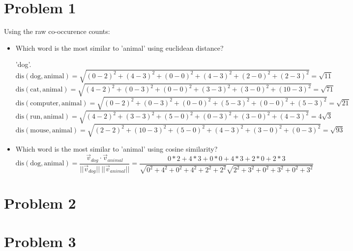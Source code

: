 \documentclass[twoside,11pt]{homework}
\date{\today} %
\begin{document}
\maketitle

\section*{Problem 1}

Using the raw co-occurence counts:
\begin{itemize}
\item Which word is the most similar to 'animal' using euclidean distance?

  'dog'.
  \[
    \text{dis}(\text{dog}, \text{animal})
    = \sqrt{(0-2)^2+(4-3)^2+(0-0)^2+(4-3)^2+(2-0)^2+(2-3)^2}
    = \sqrt{11}
  \]
  \[
    \text{dis}(\text{cat}, \text{animal})
    = \sqrt{(4-2)^2+(0-3)^2+(0-0)^2+(3-3)^2+(3-0)^2+(10-3)^2}
    = \sqrt{71}
  \]
  \[
    \text{dis}(\text{computer}, \text{animal})
    = \sqrt{(0-2)^2+(0-3)^2+(0-0)^2+(5-3)^2+(0-0)^2+(5-3)^2}
    = \sqrt{21}
  \]
  \[
    \text{dis}(\text{run}, \text{animal})
    = \sqrt{(4-2)^2+(3-3)^2+(5-0)^2+(0-3)^2+(3-0)^2+(4-3)^2}
    = 4 \sqrt{3}
  \]
  \[
    \text{dis}(\text{mouse}, \text{animal})
    = \sqrt{(2-2)^2+(10-3)^2+(5-0)^2+(4-3)^2+(3-0)^2+(0-3)^2}
    = \sqrt{93}
  \]
\item Which word is the most similar to 'animal' using cosine similarity?
  \[
    \text{dis}(\text{dog}, \text{animal})
    = \frac{\vec{v}_{dog} \cdot \vec{v}_{animal}}{||\vec{v}_{dog}|| \ ||\vec{v}_{animal}||}
    = \frac{0*2 + 4*3 + 0*0 + 4*3 + 2*0 + 2*3}{ \sqrt{0^2+4^2+0^2+4^2+2^2+2^2} \sqrt{2^2+3^2+0^2+3^2+0^2+3^2}}
  \]

\end{itemize}

\section*{Problem 2}

\section*{Problem 3}
\end{document}
